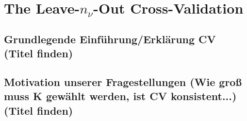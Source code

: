 \documentclass[Research_Module_ES.tex]{subfiles}
\begin{document}
\section{The Leave-$n_{\nu}$-Out Cross-Validation}
\subsection{Grundlegende Einführung/Erklärung CV (Titel finden)}
\subsection{Motivation unserer Fragestellungen (Wie groß muss K gewählt werden, ist CV konsistent...)(Titel finden)}
\end{document}
